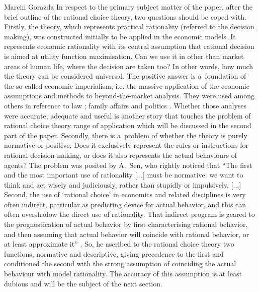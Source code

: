 \begin{artengenv}{Marcin Gorazda}
In respect to the primary subject matter of the paper, after the brief outline of the rational choice theory, two questions should be coped with. Firstly, the theory, which represents practical rationality (referred to the decision making), was constructed initially to be applied in the economic models. It represents economic rationality with its central assumption that rational decision is aimed at utility function maximisation. Can we use it in other than market areas of human life, where the decision are taken too? In other words, how much the theory can be considered universal. The positive answer is a~foundation of the so-called economic imperialism, i.e. the massive application of the economic assumptions and methods to beyond-the-market analysis. They were used among others in reference to law
\parencites[][]{stelmach_dziesiec_2007}[][]{posner_economic_1972}; %
 family affairs 
\parencite[][]{becker_treatise_1981} %
 and politics 
\parencite[][]{tullock_calculus_1998}. %
 Whether those analyses were accurate, adequate and useful is another story that touches the problem of rational choice theory range of application which will be discussed in the second part of the paper. Secondly, there is a~problem of whether the theory is purely normative or positive. Does it exclusively represent the rules or instructions for rational decision-making, or does it also represents the actual behaviours of agents? The problem was posited by A.~Sen, who rightly noticed that ``The first and the most important use of rationality [...] must be normative: we want to think and act wisely and judiciously, rather than stupidly or impulsively. [...] Second, the use of ‘rational choice' in economics and related disciplines is very often indirect, particular as predicting device for actual behavior, and this can often overshadow the direct use of rationality. That indirect program is geared to the prognostication of actual behavior by first characterising rational behavior, and then assuming that actual behavior will coincide with rational behavior, or at least approximate it'' 
\parencite[][p.42]{sen_rationality_2003}. %
 So, he ascribed to the rational choice theory two functions, normative and descriptive, giving precedence to the first and conditioned the second with the strong assumption of coinciding the actual behaviour with model rationality. The accuracy of this assumption is at least dubious and will be the subject of the next section.


\end{artengenv}
